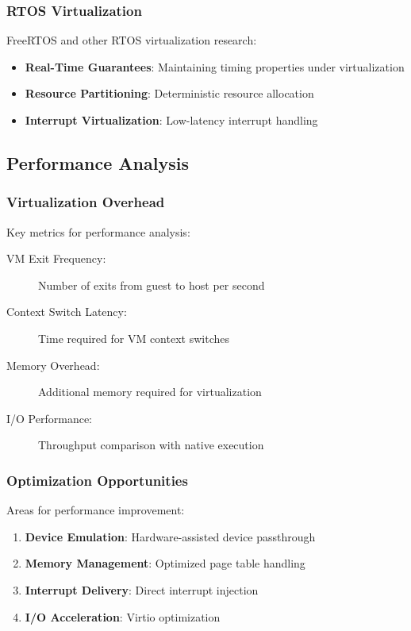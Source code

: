 \documentclass[11pt,a4paper]{article}
\begin{document}
\subsubsection{RTOS Virtualization}

FreeRTOS and other RTOS virtualization research:

\begin{itemize}
\item \textbf{Real-Time Guarantees}: Maintaining timing properties under virtualization
\item \textbf{Resource Partitioning}: Deterministic resource allocation
\item \textbf{Interrupt Virtualization}: Low-latency interrupt handling
\end{itemize}

\subsection{Performance Analysis}

\subsubsection{Virtualization Overhead}

Key metrics for performance analysis:

\begin{description}
\item[VM Exit Frequency:] Number of exits from guest to host per second
\item[Context Switch Latency:] Time required for VM context switches
\item[Memory Overhead:] Additional memory required for virtualization
\item[I/O Performance:] Throughput comparison with native execution
\end{description}

\subsubsection{Optimization Opportunities}

Areas for performance improvement:

\begin{enumerate}
\item \textbf{Device Emulation}: Hardware-assisted device passthrough
\item \textbf{Memory Management}: Optimized page table handling
\item \textbf{Interrupt Delivery}: Direct interrupt injection
\item \textbf{I/O Acceleration}: Virtio optimization
\end{enumerate}
\end{document}
